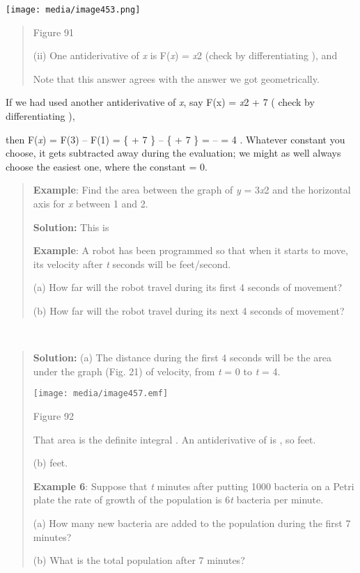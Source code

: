 \texttt{[image: media/image453.png]}

\begin{quote}
Figure 91

(ii) One antiderivative of \emph{x} is F(\emph{x}) = \emph{x}2 (check by
differentiating ), and

Note that this answer agrees with the answer we got geometrically.
\end{quote}

If we had used another antiderivative of \emph{x}, say F(x) = \emph{x}2
+ 7 ( check by differentiating ),

then F(\emph{x}) \textbar{}= F(3) -- F(1) = \{ + 7 \} -- \{ + 7 \} = --
= 4 . Whatever constant you choose, it gets subtracted away during the
evaluation; we might as well always choose the easiest one, where the
constant = 0.

\begin{quote}
\textbf{Example}: Find the area between the graph of \emph{y} =
3\emph{x}2 and the horizontal axis for \emph{x} between 1 and 2.

\textbf{Solution:} This is

\textbf{Example}: A robot has been programmed so that when it starts to
move, its velocity after \emph{t} seconds will be feet/second.

(a) How far will the robot travel during its first 4 seconds of
movement?

(b) How far will the robot travel during its next 4 seconds of movement?
\end{quote}

\textbf{\\
}

\begin{quote}
\textbf{Solution:} (a) The distance during the first 4 seconds will be
the area under the graph (Fig. 21) of velocity, from \emph{t} = 0 to
\emph{t} = 4.

\texttt{[image: media/image457.emf]}

Figure 92

That area is the definite integral . An antiderivative of is , so feet.

(b) feet.

\textbf{Example 6}: Suppose that \emph{t} minutes after putting 1000
bacteria on a Petri plate the rate of growth of the population is
6\emph{t} bacteria per minute.

(a) How many new bacteria are added to the population during the first 7
minutes?

(b) What is the total population after 7 minutes?
\end{quote}

